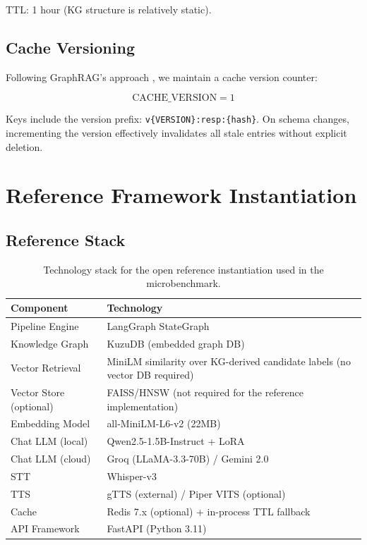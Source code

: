 \documentclass[11pt,a4paper,twocolumn]{article}
\begin{document}
\noindent TTL: 1 hour (KG structure is relatively static).

\subsection{Cache Versioning}

Following GraphRAG's approach \cite{edge2024graphrag}, we maintain a cache version counter:

\begin{equation}
\text{CACHE\_VERSION} = 1
\end{equation}

\noindent Keys include the version prefix: \texttt{v\{VERSION\}:resp:}\allowbreak\texttt{\{hash\}}. On schema changes, incrementing the version effectively invalidates all stale entries without explicit deletion.

\section{Reference Framework Instantiation}
\label{sec:implementation}

\subsection{Reference Stack}

\begin{table}[h]
\centering
\caption{Technology stack for the open reference instantiation used in the microbenchmark.}
\label{tab:stack}
{\scriptsize
\setlength{\tabcolsep}{4pt}
\begin{tabularx}{\columnwidth}{@{}Y Y@{}}
\toprule
\textbf{Component}      & \textbf{Technology} \\
\midrule
Pipeline Engine          & LangGraph StateGraph \\
Knowledge Graph          & KuzuDB (embedded graph DB) \\
Vector Retrieval          & MiniLM similarity over KG-derived candidate labels (no vector DB required) \\
Vector Store (optional)  & FAISS/HNSW (not required for the reference implementation) \\
Embedding Model          & all-MiniLM-L6-v2 (22MB) \cite{wang2020minilm,reimers2019sentencebert} \\
Chat LLM (local)         & Qwen2.5-1.5B-Instruct + LoRA \\
Chat LLM (cloud)         & Groq (LLaMA-3.3-70B) / Gemini 2.0 \\
STT                      & Whisper-v3 \\
TTS                      & gTTS (external) / Piper VITS (optional) \\
Cache                    & Redis 7.x (optional) + in-process TTL fallback \\
API Framework            & FastAPI (Python 3.11) \\
\bottomrule
\end{tabularx}
}
\end{table}
\end{document}
